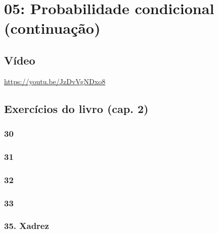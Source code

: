 \documentclass[
  11pt]{report}
\begin{document}
\hypertarget{probabilidade-condicional-continuauxe7uxe3o}{%
\chapter*{05: Probabilidade condicional (continuação)}\label{probabilidade-condicional-continuauxe7uxe3o}}

\hypertarget{vuxeddeo-4}{%
\section*{Vídeo}\label{vuxeddeo-4}}

\begin{center} \url{https://youtu.be/JzDvVgNDxo8} \end{center}

\hypertarget{exercuxedcios-do-livro-cap.-2-1}{%
\section*{Exercícios do livro (cap. 2)}\label{exercuxedcios-do-livro-cap.-2-1}}

\hypertarget{section-17}{%
\subsection*{30}\label{section-17}}

\hypertarget{section-18}{%
\subsection*{31}\label{section-18}}

\hypertarget{section-19}{%
\subsection*{32}\label{section-19}}

\hypertarget{section-20}{%
\subsection*{33}\label{section-20}}

\hypertarget{xadrez}{%
\subsection*{35. Xadrez}\label{xadrez}}
\end{document}
